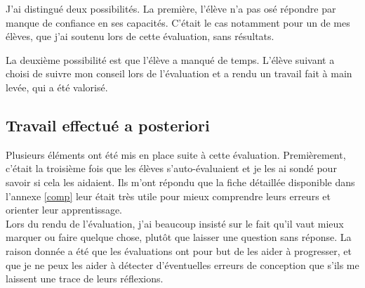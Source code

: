 J'ai distingué deux possibilités. La première, l'élève n'a pas osé répondre par manque de confiance en ses capacités. C'était le cas notamment pour un de mes élèves, que j'ai soutenu lors de cette évaluation, sans résultats. 

La deuxième possibilité est que l'élève a manqué de temps. L'élève suivant a choisi de suivre mon conseil lors de l'évaluation et a rendu un travail fait à main levée, qui a été valorisé.

\begin{figure}[!h]
\end{figure}

\newpage
\subsection{Travail effectué a posteriori}
Plusieurs éléments ont été mis en place suite à cette évaluation. Premièrement, c'était la troisième fois que les élèves s'auto-évaluaient et je les ai sondé pour savoir si cela les aidaient. Ils m'ont répondu que la fiche détaillée disponible dans l'annexe \ref{comp} leur était très utile pour mieux comprendre leurs erreurs et orienter leur apprentissage.\\

Lors du rendu de l'évaluation, j'ai beaucoup insisté sur le fait qu'il vaut mieux marquer ou faire quelque chose, plutôt que laisser une question sans réponse. La raison donnée a été que les évaluations ont pour but de les aider à progresser, et que je ne peux les aider à détecter d'éventuelles erreurs de conception que s'ils me laissent une trace de leurs réflexions.\\

